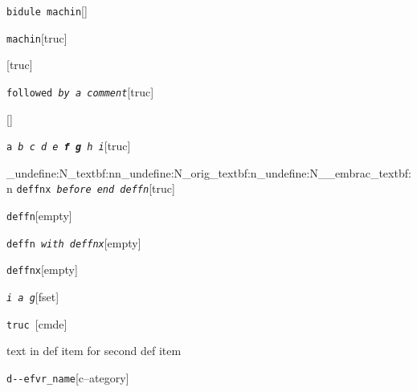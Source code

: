 \documentclass{book}
\begin{document}
%
\noindent\texttt{bidule machin}\hfill[]



%
\noindent\texttt{machin}\hfill[truc]



%
\noindent\texttt{}\hfill[truc]



\noindent\texttt{followed \EmbracOn{}\textnormal{\textsl{by a comment}}\EmbracOff{}}\hfill[truc]



%
\noindent\texttt{}\hfill[]



\noindent\texttt{a \EmbracOn{}\textnormal{\textsl{b c d e \textbf{f g} h i}}\EmbracOff{}}\hfill[truc]


\ExplSyntaxOn%
\cs_undefine:N{\embrac_textbf:nn}\cs_undefine:N{\embrac_orig_textbf:n}\cs_undefine:N{\__embrac_textbf:n}%
\ExplSyntaxOff%
%
\noindent\texttt{deffnx \EmbracOn{}\textnormal{\textsl{before end deffn}}\EmbracOff{}}\hfill[truc]



%


\noindent\texttt{deffn}\hfill[empty]



%

\noindent\texttt{deffn \EmbracOn{}\textnormal{\textsl{with deffnx}}\EmbracOff{}}\hfill[empty]



%
\noindent\texttt{deffnx}\hfill[empty]



%

\noindent\texttt{\textsl{i} \EmbracOn{}\textnormal{\textsl{a g}}\EmbracOff{}}\hfill[fset]



%
\noindent\texttt{truc \EmbracOn{}\textnormal{\textsl{}}\EmbracOff{}}\hfill[cmde]



%
text in def item for second def item


\noindent\texttt{d{-}{-}efvr\_name}\hfill[c--ategory]
\end{document}
